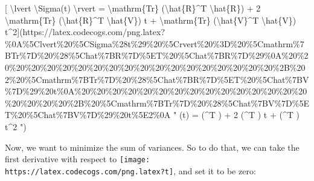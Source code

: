 \documentclass[]{article}
\begin{document}
{[} \textbackslash{}lvert \textbackslash{}Sigma(t) \textbackslash{}rvert =
\textbackslash{}mathrm\{Tr\} (\textbackslash{}hat\{R\}\^{}T
\textbackslash{}hat\{R\}) + 2 \textbackslash{}mathrm\{Tr\}
(\textbackslash{}hat\{R\}\^{}T \textbackslash{}hat\{V\}) t +
\textbackslash{}mathrm\{Tr\} (\textbackslash{}hat\{V\}\^{}T
\textbackslash{}hat\{V\})
t\^{}2{]}(https://latex.codecogs.com/png.latex?\%0A\%5Clvert\%20\%5CSigma\%28t\%29\%20\%5Crvert\%20\%3D\%20\%5Cmathrm\%7BTr\%7D\%20\%28\%5Chat\%7BR\%7D\%5ET\%20\%5Chat\%7BR\%7D\%29\%0A\%20\%20\%20\%20\%20\%20\%20\%20\%20\%20\%20\%20\%20\%20\%20\%20\%20\%20\%20\%2B\%202\%20\%5Cmathrm\%7BTr\%7D\%20\%28\%5Chat\%7BR\%7D\%5ET\%20\%5Chat\%7BV\%7D\%29\%20t\%0A\%20\%20\%20\%20\%20\%20\%20\%20\%20\%20\%20\%20\%20\%20\%20\%20\%20\%20\%20\%2B\%20\%5Cmathrm\%7BTr\%7D\%20\%28\%5Chat\%7BV\%7D\%5ET\%20\%5Chat\%7BV\%7D\%29\%20t\%5E2\%0A
" \lvert \Sigma(t) \rvert =  (\^{}T ) + 2 
(\^{}T ) t +  (\^{}T ) t\^{}2 ")

Now, we want to minimize the sum of variances. So to do that, we can take the
first derivative with respect to
\texttt{[image: https://latex.codecogs.com/png.latex?t]}, and set it to be zero:
\end{document}
